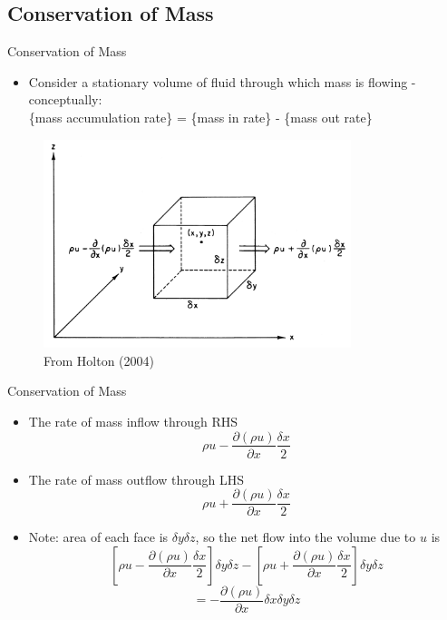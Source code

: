 \subsection{Conservation of Mass}
\begin{frame}{Conservation of Mass}

\begin{itemize}
	\item Consider a stationary volume of fluid through which mass is flowing - conceptually:\\
	\{mass accumulation rate\} = \{mass in rate\} - \{mass out rate\}
\end{itemize}
\begin{figure}
\includegraphics[width=0.8\textwidth]{fig1.png}\\
\centering \small From Holton (2004)
\end{figure}
\end{frame}
\begin{frame}{Conservation of Mass}

\begin{itemize}
	\item The rate of mass inflow through RHS
	$$\rho u - \frac{\partial (\rho u)}{\partial x}\frac{\delta x}{2}$$
	\item The rate of mass outflow through LHS
	$$\rho u + \frac{\partial (\rho u)}{\partial x}\frac{\delta x}{2}$$
	\item Note: area of each face is $\delta y \delta z$, so the net flow into the volume due to $u$ is
	$$\left[\rho u - \frac{\partial (\rho u)}{\partial x}\frac{\delta x}{2}\right]\delta y \delta z - \left[\rho u + \frac{\partial (\rho u)}{\partial x}\frac{\delta x}{2}\right]\delta y \delta z$$
	$$= -\frac{\partial (\rho u)}{\partial x} \delta x \delta y \delta z$$
\end{itemize}

\end{frame}


